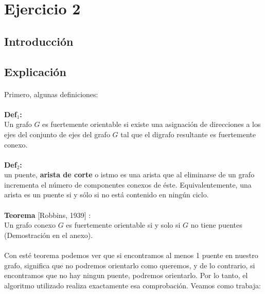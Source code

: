 \section{Ejercicio 2}

\subsection{Introducción}
\label{introej2}
	
\subsection{Explicación}

\paragraph{}
Primero, algunas definiciones:

\paragraph{}
\textbf{Def$_1$:}
\\
Un grafo $G$ es fuertemente orientable si existe una asignación de direcciones a los ejes del conjunto de ejes del grafo $G$ tal que el digrafo resultante es fuertemente conexo. 

\paragraph{}
\textbf{Def$_2$:}
\\
un puente, \textbf{arista de corte} o istmo es una arista que al eliminarse de un grafo incrementa el número de componentes conexos de éste. Equivalentemente, una arista es un puente si y sólo si no está contenido en ningún ciclo.

\paragraph{}
\textbf{Teorema} [Robbins, 1939] :\\
Un grafo conexo $G$ es fuertemente orientable si y solo si $G$ no tiene puentes (Demostración en el anexo).



\paragraph{} 
Con esté teorema podemos ver que si encontramos al menos 1 puente en nuestro grafo, significa que no podremos orientarlo como queremos, y de lo contrario, si encontramos que no hay ningun puente, podremos orientarlo. Por lo tanto, el algoritmo utilizado realiza exactamente esa comprobación. Veamos como trabaja:
 

